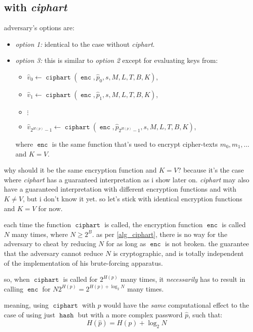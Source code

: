 \documentclass[twocolumn]{article}
\DeclareMathOperator{\enc}{\texttt{enc}}
\DeclareMathOperator{\hash}{\texttt{hash}}
\DeclareMathOperator{\ciphart}{\texttt{ciphart}}
\begin{document}
\subsection{with \emph{ciphart}}
adversary's options are:
\begin{itemize}
    \item \emph{option 1:} identical to the case without \emph{ciphart}.
    \item \emph{option 3:} this is similar to \emph{option 2} except for
    evaluating keys from:
    \begin{itemize}
        \item $\hat v_0 \gets \ciphart(\enc, \hat p_0, s, M, L, T, B, K)$,
        \item $\hat v_1 \gets \ciphart(\enc, \hat p_1, s, M, L, T, B, K)$,
        \item $\vdots$
        \item $\hat v_{2^{H(p)}-1} \gets \ciphart(\enc, \hat
        p_{2^{H(p)}-1}, s, M, L, T, B, K)$,
    \end{itemize}
    where $\enc$ is the same function that's used to encrypt cipher-texts $m_0,
    m_1, \ldots$ and $K = V$.
\end{itemize}

why should it be the same encryption function and $K=V$?  because it's the
case where \emph{ciphart} has a guaranteed interpretation as i show later
on.  \emph{ciphart} may also have a guaranteed interpretation with
different encryption functions and with $K \ne V$, but i don't know it yet.
so let's stick with identical encryption functions and $K=V$ for now.

each time the function $\ciphart$ is called, the encryption function $\enc$ is
called $N$ many times, where $N\ge2^B$.  as per \cref{alg_ciphart}, there
is no way for the adversary to cheat by reducing $N$ for as long as $\enc$
is not broken.  the guarantee that the adversary cannot reduce $N$ is
cryptographic, and is totally independent of the implementation of his
brute-forcing apparatus.

so, when $\ciphart$ is called for $2^{H(p)}$ many times, it \emph{necessarily}
has to result in calling $\enc$ for $N2^{H(p)} = 2^{H(p) + \log_2N}$ many
times.

meaning, using $\ciphart$ with $p$ would have the \emph{same} computational
effect to the case of using just $\hash$ but with a more complex password
$\hat p$, such that:
\begin{equation}
    H(\hat p) = H(p) + \log_2 N
\end{equation}
\end{document}

